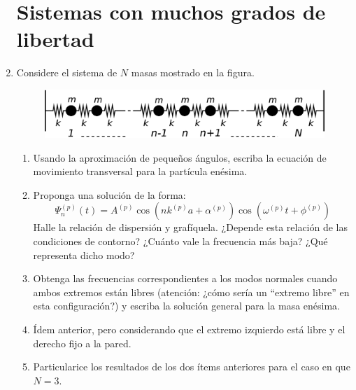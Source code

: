 \documentclass[11pt,spanish]{article}
\begin{document}
\begin{enumerate}
    \section*{Sistemas con muchos grados de libertad}


    \item Considere el sistema de $N$ masas mostrado en la figura. 

    \begin{figure}[H]
    \begin{centering}
        \includegraphics[clip,scale=0.25]{figs/ej1-11}
    \par\end{centering}
    \end{figure}

    \begin{enumerate}
        \item Usando la aproximación de pequeños ángulos, escriba la ecuación de
        movimiento transversal para la partícula enésima.

        \item Proponga una solución de la forma:
        \[
        \Psi_{n}^{(p)}(t)=A^{(p)}\cos\left(nk^{(p)}a+\alpha^{(p)}\right)\cos\left(\omega^{(p)}t+\phi^{(p)}\right)
        \]
        Halle la relación de dispersión y grafíquela. ¿Depende esta relación de
        las condiciones de contorno? ¿Cuánto vale la frecuencia más baja? ¿Qué
        representa dicho modo? 

        \item Obtenga las frecuencias correspondientes a los modos normales
        cuando ambos extremos están libres (atención: ¿cómo sería un ``extremo
        libre'' en esta configuración?) y escriba la solución general para la
        masa enésima. 
        
        \item Ídem anterior, pero considerando que el extremo izquierdo está
        libre y el derecho fijo a la pared.

        \item Particularice los resultados de los dos ítems anteriores para el
        caso en que $N=3$.
    \end{enumerate}


\end{enumerate}
\end{document}
